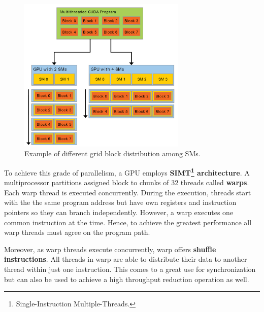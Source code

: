 \begin{figure}\centering
 	\includegraphics[width=8cm]{img/SM}
 	\caption{Example of different grid block distribution among SMs.}
 	\label{fig02:SM}
\end{figure}

To achieve this grade of parallelism, a GPU employs \textbf{SIMT\footnote{Single-Instruction Multiple-Threads.} architecture}. A multiprocessor partitions assigned block to chunks of 32 threads called \textbf{warps}. Each warp thread is executed concurrently. During the execution, threads start with the the same program address but have own registers and instruction pointers so they can branch independently. However, a warp executes one common instruction at the time. Hence, to achieve the greatest performance all warp threads must agree on the program path.

Moreover, as warp threads execute concurrently, warp offers \textbf{shuffle instructions}. All threads in warp are able to distribute their data to another thread within just one instruction. This comes to a great use for synchronization but can also be used to achieve a high throughput reduction operation as well.
